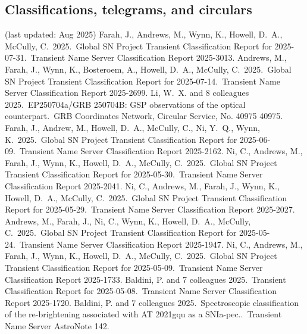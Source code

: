 \documentclass[margin,line]{res}
\begin{document}
\begin{resume}
\vspace{+.4cm}
\section{\sc Classifications, telegrams, and circulars}
(last updated: Aug 2025)
 Farah, J., Andrews, M., Wynn, K., Howell, D.~A., McCully, C.\ 2025.\ Global SN Project Transient Classification Report for 2025-07-31.\ Transient Name Server Classification Report 2025-3013.
 Andrews, M., Farah, J., Wynn, K., Bosteroem, A., Howell, D.~A., McCully, C.\ 2025.\ Global SN Project Transient Classification Report for 2025-07-14.\ Transient Name Server Classification Report 2025-2699.
 Li, W.~X. and 8 colleagues 2025.\ EP250704a/GRB 250704B: GSP observations of the optical counterpart.\ GRB Coordinates Network, Circular Service, No. 40975 40975.
 Farah, J., Andrew, M., Howell, D.~A., McCully, C., Ni, Y.~Q., Wynn, K.\ 2025.\ Global SN Project Transient Classification Report for 2025-06-09.\ Transient Name Server Classification Report 2025-2162.
 Ni, C., Andrews, M., Farah, J., Wynn, K., Howell, D.~A., McCully, C.\ 2025.\ Global SN Project Transient Classification Report for 2025-05-30.\ Transient Name Server Classification Report 2025-2041.
 Ni, C., Andrews, M., Farah, J., Wynn, K., Howell, D.~A., McCully, C.\ 2025.\ Global SN Project Transient Classification Report for 2025-05-29.\ Transient Name Server Classification Report 2025-2027.
 Andrews, M., Farah, J., Ni, C., Wynn, K., Howell, D.~A., McCully, C.\ 2025.\ Global SN Project Transient Classification Report for 2025-05-24.\ Transient Name Server Classification Report 2025-1947.
 Ni, C., Andrews, M., Farah, J., Wynn, K., Howell, D.~A., McCully, C.\ 2025.\ Global SN Project Transient Classification Report for 2025-05-09.\ Transient Name Server Classification Report 2025-1733.
 Baldini, P. and 7 colleagues 2025.\ Transient Classification Report for 2025-05-08.\ Transient Name Server Classification Report 2025-1720.
 Baldini, P. and 7 colleagues 2025.\ Spectroscopic classification of the re-brightening associated with AT 2021gqu as a SNIa-pec..\ Transient Name Server AstroNote 142.

\end{resume}
\end{document}
